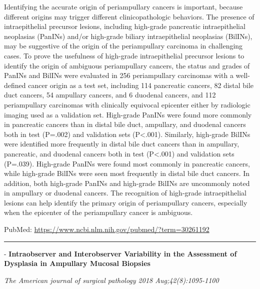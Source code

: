 \documentclass[]{article}
\begin{document}
Identifying the accurate origin of periampullary cancers is important,
because different origins may trigger different clinicopathologic
behaviors. The presence of intraepithelial precursor lesions, including
high-grade pancreatic intraepithelial neoplasias (PanINs) and/or
high-grade biliary intraepithelial neoplasias (BilINs), may be
suggestive of the origin of the periampullary carcinoma in challenging
cases. To prove the usefulness of high-grade intraepithelial precursor
lesions to identify the origin of ambiguous periampullary cancers, the
status and grades of PanINs and BilINs were evaluated in 256
periampullary carcinomas with a well-defined cancer origin as a test
set, including 114 pancreatic cancers, 82 distal bile duct cancers, 54
ampullary cancers, and 6 duodenal cancers, and 112 periampullary
carcinomas with clinically equivocal epicenter either by radiologic
imaging used as a validation set. High-grade PanINs were found more
commonly in pancreatic cancers than in distal bile duct, ampullary, and
duodenal cancers both in test (P=.002) and validation sets
(P\textless{}.001). Similarly, high-grade BilINs were identified more
frequently in distal bile duct cancers than in ampullary, pancreatic,
and duodenal cancers both in test (P\textless{}.001) and validation sets
(P=.039). High-grade PanINs were found most commonly in pancreatic
cancers, while high-grade BilINs were seen most frequently in distal
bile duct cancers. In addition, both high-grade PanINs and high-grade
BilINs are uncommonly noted in ampullary or duodenal cancers. The
recognition of high-grade intraepithelial lesions can help identify the
primary origin of periampullary cancers, especially when the epicenter
of the periampullary cancer is ambiguous.

PubMed: \url{https://www.ncbi.nlm.nih.gov/pubmed/?term=30261192}

{}

{}

\begin{center}\rule{0.5\linewidth}{\linethickness}\end{center}

 - \textbf{Intraobserver and Interobserver Variability in the Assessment
of Dysplasia in Ampullary Mucosal Biopsies}

\emph{The American journal of surgical pathology 2018
Aug;42(8):1095-1100}
\end{document}
